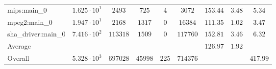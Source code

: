 \begin{tabular}{|l|c|c|c|c|c|c|c|c|}
mips:main\_0            & $ 1.625 \cdot 10^{1}  $ & $ 2493   $ & $ 725   $ & $ 4   $ & $ 3072   $ & $ 153.44      $ & $ 3.48    $ & $ 5.34    $ \\
mpeg2:main\_0           & $ 1.947 \cdot 10^{1}  $ & $ 2168   $ & $ 1317  $ & $ 0   $ & $ 16384  $ & $ 111.35      $ & $ 1.02    $ & $ 3.47    $ \\
sha\_driver:main\_0     & $ 7.416 \cdot 10^{2}  $ & $ 113318 $ & $ 1509  $ & $ 0   $ & $ 117760 $ & $ 152.81      $ & $ 3.46    $ & $ 6.32    $ \\
\hline
Average                 & $                     $ & $        $ & $       $ & $     $ & $        $ & $ 126.97      $ & $ 1.92    $ & $         $ \\
\hline
Overall                 & $ 5.328 \cdot 10^{3}  $ & $ 697028 $ & $ 45998 $ & $ 225 $ & $ 714376 $ & $             $ & $         $ & $ 417.99  $ \\
\hline
\end{tabular}
